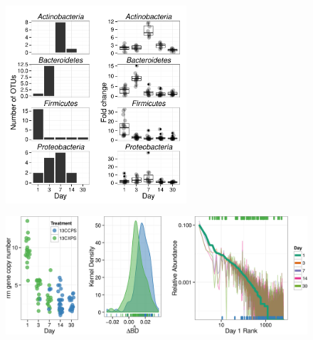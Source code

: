 \begin{figure}[H]
	\begin{center}
	\centerline{\includegraphics[width=0.6\textwidth]{figures/xylose_rspndr_bar/xylose_rspndr_bar.pdf}}
	\caption{\protect}\label{fig:xyl_count}
        \end{center}
\end{figure}

\begin{figure}[H]
	\begin{center}
	\centerline{\includegraphics[width=15.4cm]{figures/shift_and_rabund3/shift_and_rabund300.png}}
	\caption{\protect}\label{fig:shift}
    \end{center}
\end{figure}


\restoregeometry
